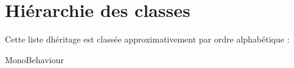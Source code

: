 \section{Hiérarchie des classes}
Cette liste d\textquotesingle{}héritage est classée approximativement par ordre alphabétique \+:\begin{DoxyCompactList}
\item Mono\+Behaviour\begin{DoxyCompactList}
\item {}
\item {}
\item {}
\item {}
\item {}
\end{DoxyCompactList}
\end{DoxyCompactList}
